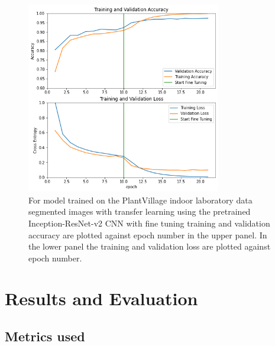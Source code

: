 \documentclass[conference]{IEEEtran}
\begin{document}
\begin{figure}[htbp]
\centerline{\includegraphics[width=8.5cm]{ModelIndoorsResNetEpochsSegmentedAccuracychart_new.png}}
\caption{For model trained on the PlantVillage indoor laboratory data segmented images with transfer learning using the pretrained Inception-ResNet-v2 CNN with fine tuning training and validation accuracy are plotted against epoch number in the upper panel. In the lower panel the training and validation loss are plotted against epoch number.}
\label{fig}
\end{figure}
 

\section{Results and Evaluation}


\subsection{Metrics used} 
\end{document}
